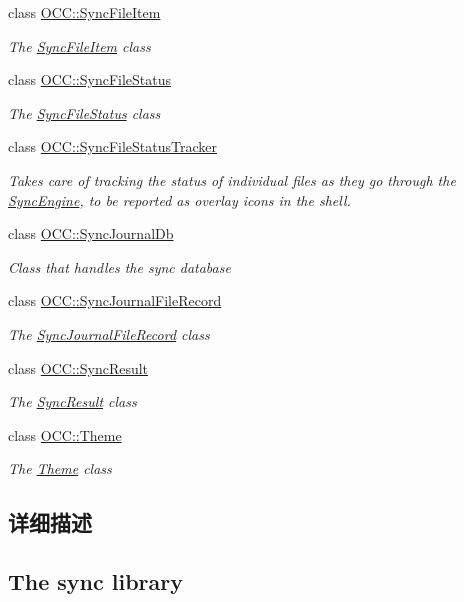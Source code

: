 \begin{DoxyCompactItemize}
class \hyperlink{class_o_c_c_1_1_sync_file_item}{O\+C\+C\+::\+Sync\+File\+Item}
\begin{DoxyCompactList}\small\item\em The \hyperlink{class_o_c_c_1_1_sync_file_item}{Sync\+File\+Item} class \end{DoxyCompactList}\item 
class \hyperlink{class_o_c_c_1_1_sync_file_status}{O\+C\+C\+::\+Sync\+File\+Status}
\begin{DoxyCompactList}\small\item\em The \hyperlink{class_o_c_c_1_1_sync_file_status}{Sync\+File\+Status} class \end{DoxyCompactList}\item 
class \hyperlink{class_o_c_c_1_1_sync_file_status_tracker}{O\+C\+C\+::\+Sync\+File\+Status\+Tracker}
\begin{DoxyCompactList}\small\item\em Takes care of tracking the status of individual files as they go through the \hyperlink{class_o_c_c_1_1_sync_engine}{Sync\+Engine}, to be reported as overlay icons in the shell. \end{DoxyCompactList}\item 
class \hyperlink{class_o_c_c_1_1_sync_journal_db}{O\+C\+C\+::\+Sync\+Journal\+Db}
\begin{DoxyCompactList}\small\item\em Class that handles the sync database \end{DoxyCompactList}\item 
class \hyperlink{class_o_c_c_1_1_sync_journal_file_record}{O\+C\+C\+::\+Sync\+Journal\+File\+Record}
\begin{DoxyCompactList}\small\item\em The \hyperlink{class_o_c_c_1_1_sync_journal_file_record}{Sync\+Journal\+File\+Record} class \end{DoxyCompactList}\item 
class \hyperlink{class_o_c_c_1_1_sync_result}{O\+C\+C\+::\+Sync\+Result}
\begin{DoxyCompactList}\small\item\em The \hyperlink{class_o_c_c_1_1_sync_result}{Sync\+Result} class \end{DoxyCompactList}\item 
class \hyperlink{class_o_c_c_1_1_theme}{O\+C\+C\+::\+Theme}
\begin{DoxyCompactList}\small\item\em The \hyperlink{class_o_c_c_1_1_theme}{Theme} class \end{DoxyCompactList}\end{DoxyCompactItemize}


\subsection{详细描述}
\subsection*{The sync library }